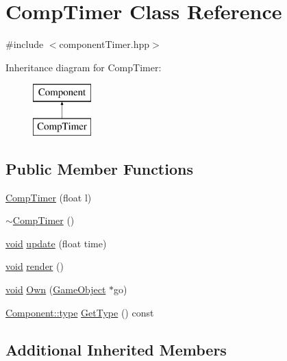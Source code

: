 \hypertarget{class_comp_timer}{\section{Comp\-Timer Class Reference}
\label{class_comp_timer}
}


{\ttfamily \#include $<$component\-Timer.\-hpp$>$}

Inheritance diagram for Comp\-Timer\-:\begin{figure}[H]
\begin{center}
\leavevmode
\includegraphics[height=2.000000cm]{class_comp_timer}
\end{center}
\end{figure}
\subsection*{Public Member Functions}
\begin{DoxyCompactItemize}
\item 
\hyperlink{class_comp_timer_a42e3895baea9f3bd1c75e88dea280843}{Comp\-Timer} (float l)
\item 
\hyperlink{class_comp_timer_a93ee349dbfed7c5cf6d4181f963bd2b8}{$\sim$\-Comp\-Timer} ()
\item 
\hyperlink{_s_d_l__opengles2__gl2ext_8h_ae5d8fa23ad07c48bb609509eae494c95}{void} \hyperlink{class_comp_timer_a6d5a7782297956042ba4dd8eb20a42fc}{update} (float time)
\item 
\hyperlink{_s_d_l__opengles2__gl2ext_8h_ae5d8fa23ad07c48bb609509eae494c95}{void} \hyperlink{class_comp_timer_acdf498b351f60ce88f2b1ca8c91c2338}{render} ()
\item 
\hyperlink{_s_d_l__opengles2__gl2ext_8h_ae5d8fa23ad07c48bb609509eae494c95}{void} \hyperlink{class_comp_timer_aaab87f070ccd03302dd8028a8ad8a9d1}{Own} (\hyperlink{class_game_object}{Game\-Object} $\ast$go)
\item 
\hyperlink{class_component_ad6d161b6acf7b843b55bb9feac7af71a}{Component\-::type} \hyperlink{class_comp_timer_a6e1db211f4104879a1f36cb82320663c}{Get\-Type} () const 
\end{DoxyCompactItemize}
\subsection*{Additional Inherited Members}


